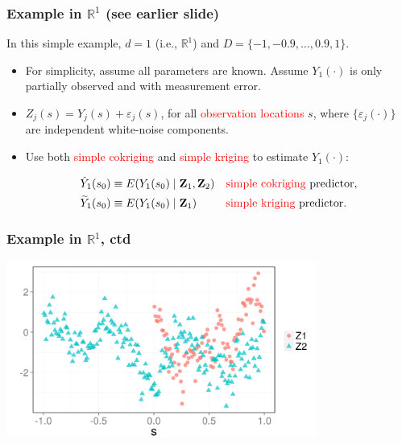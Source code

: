 \documentclass{beamer}
\newcommand{\Zvec}{\mathbf{Z}}
\newcommand{\E}{E}
\begin{document}

\begin{frame}
\frametitle{Example in $\mathbb{R}^1$ (see earlier slide)}
In this simple example, $d=1$ (i.e., $\mathbb{R}^1$) and $D=\{-1,-0.9,\ldots,0.9,1\}$.
\begin{itemize}
\item For simplicity, assume all parameters are known. Assume $Y_1(\cdot)$ is only partially observed and with measurement error.
\item $Z_j(s)=Y_j(s)+\varepsilon_j(s)$, for all \textcolor{red}{observation locations} $s$, where $\{\varepsilon_j(\cdot)\}$ are independent white-noise components.
\item Use both \textcolor{red}{simple cokriging} and \textcolor{red}{simple kriging} to estimate $Y_1(\cdot)$:

\begin{align*}
\hat Y_1(s_0) &\equiv \E(Y_1(s_0) \mid  \Zvec_1, \Zvec_2)&&\textrm{\textcolor{red}{simple cokriging} predictor}, \\
\widetilde Y_1(s_0) &\equiv \E(Y_1(s_0) \mid  \Zvec_1)&&\textrm{\textcolor{red}{simple kriging} predictor}.
\end{align*}\vfill
\end{itemize}

\end{frame}


\begin{frame}
\frametitle{Example in $\mathbb{R}^1$, ctd}
\begin{center}
\includegraphics[width=4in]{./sim_obs.png}
\end{center}
\end{frame}

\end{document}
